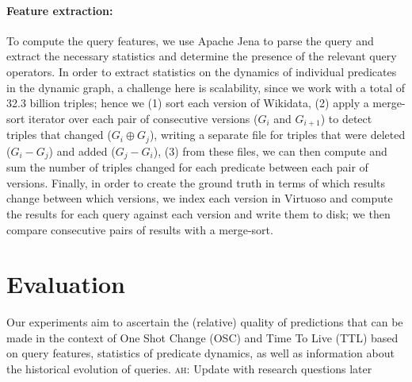\documentclass[runningheads]{llncs}
\newcommand{\ah}[1]{{\color{blue}\textsc{ah:} #1}}
\begin{document}
\paragraph{Feature extraction:} To compute the query features, we use Apache Jena to parse the query and extract the necessary statistics and determine the presence of the relevant query operators. In order to extract statistics on the dynamics of individual predicates in the dynamic graph, a challenge here is scalability, since we work with a total of 32.3 billion triples; hence we (1) sort each version of Wikidata, (2) apply a merge-sort iterator over each pair of consecutive versions ($G_i$ and $G_{i+1}$) to detect triples that changed ($G_i \oplus G_j$), writing a separate file for triples that were deleted ($G_i - G_j$) and added ($G_j - G_i$), (3) from these files, we can then compute and sum the number of triples changed for each predicate between each pair of versions. Finally, in order to create the ground truth in terms of which results change between which versions, we index each version in Virtuoso and compute the results for each query against each version and write them to disk; we then compare consecutive pairs of results with a merge-sort.


\section{Evaluation}
\label{sec:eval}

%

Our experiments aim to ascertain the (relative) quality of predictions that can be made in the context of One Shot Change (OSC) and Time To Live (TTL) based on query features, statistics of predicate dynamics, as well as information about the historical evolution of queries.  \ah{Update with research questions later}
\end{document}
